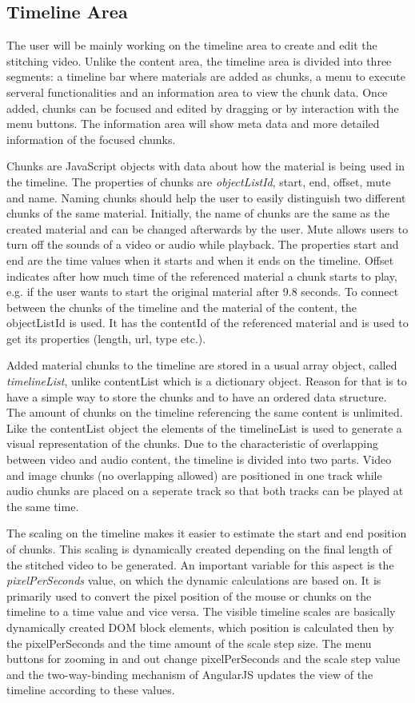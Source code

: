 \documentclass[conference]{IEEEtran}
\begin{document}
\subsection{Timeline Area}
The user will be mainly working on the timeline area to create and edit the stitching video.
Unlike the content area, the timeline area is divided into three segments: a timeline bar where materials are added as chunks, a menu to execute serveral functionalities and an information area to view the chunk data.
Once added, chunks can be focused and edited by dragging or by interaction with the menu buttons.
The information area will show meta data and more detailed information of the focused chunks.

Chunks are JavaScript objects with data about how the material is being used in the timeline.
The properties of chunks are \textit{objectListId}, start, end, offset, mute and name.
Naming chunks should help the user to easily distinguish two different chunks of the same material.
Initially, the name of chunks are the same as the created material and can be changed afterwards by the user.
Mute allows users to turn off the sounds of a video or audio while playback.
The properties start and end are the time values when it starts and when it ends on the timeline.
Offset indicates after how much time of the referenced material a chunk starts to play, e.g. if the user wants to start the original material after 9.8 seconds.
To connect between the chunks of the timeline and the material of the content, the objectListId is used.
It has the contentId of the referenced material and is used to get its properties (length, url, type etc.).

Added material chunks to the timeline are stored in a usual array object, called \textit{timelineList}, unlike contentList which is a dictionary object.
Reason for that is to have a simple way to store the chunks and to have an ordered data structure.
The amount of chunks on the timeline referencing the same content is unlimited.
Like the contentList object the elements of the timelineList is used to generate a visual representation of the chunks.
Due to the characteristic of overlapping between video and audio content, the timeline is divided into two parts.
Video and image chunks (no overlapping allowed) are positioned in one track while audio chunks are placed on a seperate track so that both tracks can be played at the same time.

The scaling on the timeline makes it easier to estimate the start and end position of chunks.
This scaling is dynamically created depending on the final length of the stitched video to be generated.
An important variable for this aspect is the \textit{pixelPerSeconds} value, on which the dynamic calculations are based on.
It is primarily used to convert the pixel position of the mouse or chunks on the timeline to a time value and vice versa.
The visible timeline scales are basically dynamically created DOM block elements, which position is calculated then by the pixelPerSeconds and the time amount of the scale step size.
The menu buttons for zooming in and out change pixelPerSeconds and the scale step value and the two-way-binding mechanism of AngularJS updates the view of the timeline according to these values.
\end{document}
